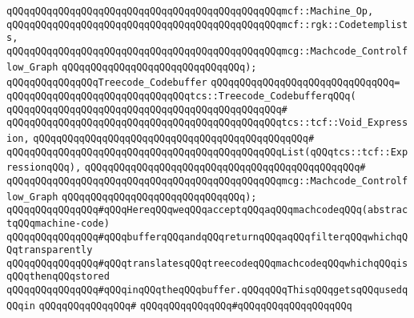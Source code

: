 \verb|qQQqqQQqqQQqqQQqqQQqqQQqqQQqqQQqqQQqqQQqqQQqqQQqmcf::Machine_Op,|\newline
\verb|qQQqqQQqqQQqqQQqqQQqqQQqqQQqqQQqqQQqqQQqqQQqqQQqmcf::rgk::Codetemplists,|\newline
\verb|qQQqqQQqqQQqqQQqqQQqqQQqqQQqqQQqqQQqqQQqqQQqqQQqmcg::Machcode_Controlflow_Graph|\newline
\verb|qQQqqQQqqQQqqQQqqQQqqQQqqQQqqQQq);|\newline
\newline
\verb|qQQqqQQqqQQqqQQqTreecode_Codebuffer|\newline
\verb|qQQqqQQqqQQqqQQqqQQqqQQqqQQqqQQq=|\newline
\verb|qQQqqQQqqQQqqQQqqQQqqQQqqQQqqQQqtcs::Treecode_CodebufferqQQq(|\newline
\verb|qQQqqQQqqQQqqQQqqQQqqQQqqQQqqQQqqQQqqQQqqQQqqQQq#|\newline
\verb|qQQqqQQqqQQqqQQqqQQqqQQqqQQqqQQqqQQqqQQqqQQqqQQqtcs::tcf::Void_Expression,|\newline
\verb|qQQqqQQqqQQqqQQqqQQqqQQqqQQqqQQqqQQqqQQqqQQqqQQq#|\newline
\verb|qQQqqQQqqQQqqQQqqQQqqQQqqQQqqQQqqQQqqQQqqQQqqQQqList(qQQqtcs::tcf::ExpressionqQQq),|\newline
\verb|qQQqqQQqqQQqqQQqqQQqqQQqqQQqqQQqqQQqqQQqqQQqqQQq#|\newline
\verb|qQQqqQQqqQQqqQQqqQQqqQQqqQQqqQQqqQQqqQQqqQQqqQQqmcg::Machcode_Controlflow_Graph|\newline
\verb|qQQqqQQqqQQqqQQqqQQqqQQqqQQqqQQq);|\newline
\newline
\newline
\verb|qQQqqQQqqQQqqQQq#qQQqHereqQQqweqQQqacceptqQQqaqQQqmachcodeqQQq(abstractqQQqmachine-code)|\newline
\verb|qQQqqQQqqQQqqQQq#qQQqbufferqQQqandqQQqreturnqQQqaqQQqfilterqQQqwhichqQQqtransparently|\newline
\verb|qQQqqQQqqQQqqQQq#qQQqtranslatesqQQqtreecodeqQQqmachcodeqQQqwhichqQQqisqQQqthenqQQqstored|\newline
\verb|qQQqqQQqqQQqqQQq#qQQqinqQQqtheqQQqbuffer.qQQqqQQqThisqQQqgetsqQQqusedqQQqin|\newline
\verb|qQQqqQQqqQQqqQQq#|\newline
\verb|qQQqqQQqqQQqqQQq#qQQqqQQqqQQqqQQqqQQq|\newline
